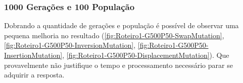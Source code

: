 \begin{center}
	\label{fig:Roteiro1-G1000P100-InversionMutation}
\end{center}
\begin{center}
	\label{fig:Roteiro1-G1000P100-SwapMutation}
\end{center}

\subsubsection{1000 Gerações e 100 População}

Dobrando a quantidade de gerações e população é possível de observar uma pequena melhoria no resultado (\ref{fig:Roteiro1-G500P50-SwapMutation}, \ref{fig:Roteiro1-G500P50-InversionMutation}, \ref{fig:Roteiro1-G500P50-InsertionMutation}, \ref{fig:Roteiro1-G500P50-DisplacementMutation}). Que provavelmente não justifique o tempo e processamento necessário parar se adquirir a resposta.

